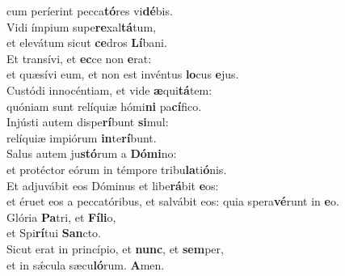 \evenverse cum períerint pecca\textbf{tó}res vi\textbf{dé}bis.\\
\oddverse Vidi ímpium supe\textbf{re}xal\textbf{tá}tum,~\*\\
\oddverse et elevátum sicut \textbf{ce}dros \textbf{Lí}bani.\\
\evenverse Et transívi, et \textbf{ec}ce non \textbf{e}rat:~\*\\
\evenverse et quæsívi eum, et non est invéntus \textbf{lo}cus \textbf{e}jus.\\
\oddverse Custódi innocéntiam, et vide \textbf{æ}qui\textbf{tá}tem:~\*\\
\oddverse quóniam sunt relíquiæ hómi\textbf{ni} pa\textbf{cí}fico.\\
\evenverse Injústi autem dispe\textbf{rí}bunt \textbf{si}mul:~\*\\
\evenverse relíquiæ impiórum \textbf{in}te\textbf{rí}bunt.\\
\oddverse Salus autem ju\textbf{stó}rum a \textbf{Dó}\textbf{mi}no:~\*\\
\oddverse et protéctor eórum in témpore tribu\textbf{la}ti\textbf{ó}nis.\\
\evenverse Et adjuvábit eos Dóminus et libe\textbf{rá}bit \textbf{e}os:~\*\\
\evenverse et éruet eos a peccatóribus, et salvábit eos: quia spera\textbf{vé}runt in \textbf{e}o.\\
\oddverse Glória \textbf{Pa}tri, et \textbf{Fí}\textbf{li}o,~\*\\
\oddverse et Spi\textbf{rí}tui \textbf{San}cto.\\
\evenverse Sicut erat in princípio, et \textbf{nunc}, et \textbf{sem}per,~\*\\
\evenverse et in sǽcula sæcu\textbf{ló}rum. \textbf{A}men.\\
